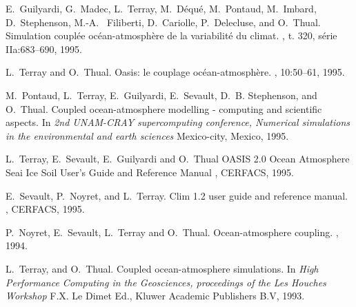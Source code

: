 \begin{thebibliography}{10}
E.~Guilyardi, G.~Madec, L.~Terray, M.~D\'equ\'e, M.~Pontaud, M.~Imbard, D.~Stephenson, M.-A. ~Filiberti, D.~Cariolle, P.~Delecluse, and O.~Thual. 
\newblock Simulation coupl\'ee oc\'ean-atmosph\`ere de la variabilit\'e du climat.
, t. 320, s\'erie IIa:683--690, 1995. 

L.~Terray and O.~Thual.
\newblock Oasis: le couplage oc\'ean-atmosph\`ere.
, 10:50--61, 1995.

M.~Pontaud, L.~Terray, E.~Guilyardi, E.~Sevault, D.~B. Stephenson, and
  O.~Thual.
\newblock Coupled ocean-atmosphere modelling - computing and scientific
  aspects.
\newblock In {\em 2nd UNAM-CRAY supercomputing conference, Numerical
  simulations in the environmental and earth sciences}
\newblock Mexico-city, Mexico, 1995.

L.~Terray, E.~Sevault, E.~Guilyardi and O.~Thual
\newblock OASIS 2.0 Ocean Atmosphere Seai Ice Soil User's Guide and Reference Manual
, CERFACS, 1995.

E.~Sevault, P.~Noyret, and L.~Terray.
\newblock Clim 1.2 user guide and reference manual.
, CERFACS, 1995.

P.~Noyret, E.~Sevault, L.~Terray and O.~Thual.
\newblock Ocean-atmosphere coupling. 
,
1994.

L.~Terray, and O.~Thual.
\newblock Coupled ocean-atmosphere simulations. 
\newblock In {\em High Performance Computing in the Geosciences,
proceedings of the Les Houches Workshop}
\newblock F.X. Le Dimet Ed., Kluwer Academic Publishers B.V, 1993.




\end{thebibliography}
